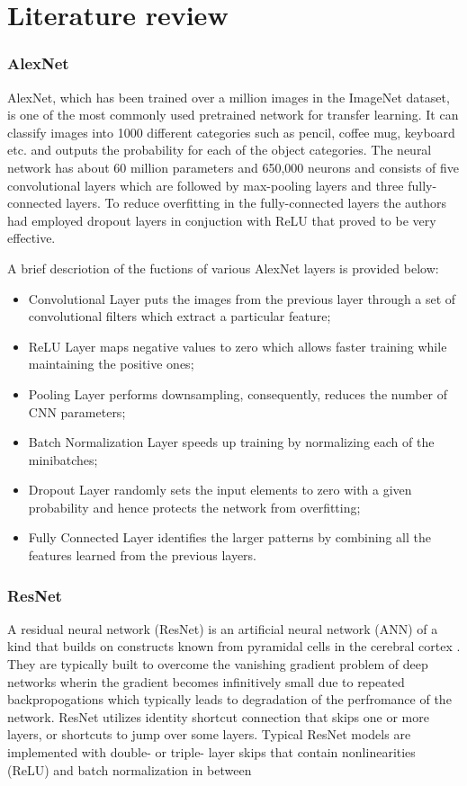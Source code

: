 \documentclass[doc/report.tex]{subfiles}
\begin{document}
\section{Literature review}

\subsubsection{AlexNet}
AlexNet\cite{Alex}, which has been trained over a million images in the
ImageNet dataset, is one of the most commonly used pretrained network for
transfer learning. It can classify images into 1000 different categories such
as pencil, coffee mug, keyboard etc. and outputs the probability for each of
the object categories. The neural network has about 60 million parameters and
650,000 neurons and consists of five convolutional layers which are followed by
max-pooling layers and three fully-connected layers. To reduce overfitting in
the fully-connected layers the authors had  employed dropout layers in
conjuction with ReLU that proved to be very effective.

A brief descriotion of the fuctions of various AlexNet layers is provided below:

\begin{itemize}
	\item Convolutional Layer puts the images from the previous layer through a set of convolutional filters which extract a particular feature;
	\item ReLU Layer maps negative values to zero which allows faster training while maintaining the positive ones;
	\item Pooling Layer performs downsampling, consequently, reduces the number of CNN parameters;
    	\item Batch Normalization Layer speeds up training by normalizing each of the minibatches;
    	\item Dropout Layer randomly sets the input elements to zero with a given probability and hence protects the network from overfitting;
    	\item Fully Connected Layer identifies the larger patterns by combining all the features learned from the previous layers.
\end{itemize}

\subsubsection{ResNet}
A residual neural network (ResNet) is an artificial neural network (ANN) of a kind that builds on constructs known from pyramidal cells in the cerebral cortex \cite{Res}. They are typically built to overcome the vanishing gradient problem of deep networks wherin the gradient becomes infinitively small due to repeated backpropogations which typically leads to degradation of the perfromance of the network. ResNet utilizes identity shortcut connection that skips one or more layers, or shortcuts to jump over some layers. Typical ResNet models are implemented with double- or triple- layer skips that contain nonlinearities (ReLU) and batch normalization in between
\end{document}
